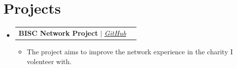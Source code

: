 \documentclass[letterpaper,11pt]{article}
\makeatletter
\newcommand{\resumeItem}[1]{
  \item\small{
    {#1 \vspace{-2pt}}
  }
}
\newcommand{\resumeProjectHeading}[2]{
    \vspace{-2pt}\item
    \begin{tabular*}{0.97\textwidth}{l@{\extracolsep{\fill}}r}
      \small#1 & #2 \\
    \end{tabular*}\vspace{-7pt}
}
\newcommand{\resumeOrganizationHeading}[4]{
  \vspace{-2pt}\item
    \begin{tabular*}{0.97\textwidth}[t]{l@{\extracolsep{\fill}}r}
      \textbf{#1} & \textit{\small #2} \\
      \textit{\small#3}
    \end{tabular*}\vspace{-7pt}
}
\newcommand{\resumeSubHeadingListStart}{\begin{itemize}[leftmargin=0.15in, label={}]}
\newcommand{\resumeSubHeadingListEnd}{\end{itemize}}
\newcommand{\resumeItemListStart}{\begin{itemize}}
\newcommand{\resumeItemListEnd}{\end{itemize}\vspace{-5pt}}
\makeatother
\begin{document}

\section{Projects}
    \vspace{3pt}
    \resumeSubHeadingListStart

      \resumeProjectHeading
        {\textbf{BISC Network Project} $|$ \emph{\href{https://github.com/Lucario-RR/BISC_Network_Project}{\color{blue}GitHub}}}{}
          \resumeItemListStart
            \resumeItem{The project aims to improve the network experience in the charity I volenteer with.}
          \resumeItemListEnd

      
    \resumeSubHeadingListEnd





        




    
    
\end{document}
